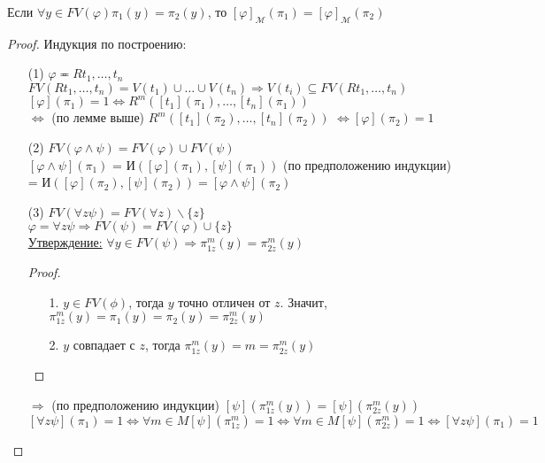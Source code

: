 \documentclass[a4paper, fleqn]{article}
\begin{document}
    \begin{lemma}
        Если $∀ y ∈ FV(\varphi) \pi_1(y) = \pi_2(y)$, то 
        $[\varphi]_{\mathcal{M}}(\pi_1) = [\varphi]_{\mathcal{M}}(\pi_2)$
    \end{lemma}
    \begin{proof}
        Индукция по построению: 
        \begin{itemize}
            \item[(1)] $\varphi \eqcirc Rt_1, \ldots, t_n$\\
            $FV(Rt_1, \ldots, t_n) = V(t_1) ∪ \ldots  ∪ V(t_n) ⇒
            V(t_i) ⊆ FV(Rt_1, \ldots, t_n)$  \\
            $[\varphi](\pi_1) = 1 ⇔ R^m([t_1](\pi_1), \ldots, [t_n](\pi_1))$
             \\
            $⇔$ (по лемме выше) $R^m([t_1](\pi_2), \ldots, [t_n](\pi_2))$
            $⇔ [\varphi](\pi_2) = 1$
            \item[(2)] 
            $FV(\varphi  ∧ \psi) = FV(\varphi) ∪ FV(\psi)$ \\
            $[\varphi  ∧ \psi](\pi_1)$ = И$([\varphi](\pi_1), [\psi](\pi_1)) 
            $ (по предположению индукции) = И$([\varphi](\pi_2), [\psi](\pi_2))
            = [\varphi  ∧ \psi](\pi_2)$
            \item[(3)]
            $FV(∀ z \psi) = FV(∀z) \backslash \{z\}$ \\  
            $\varphi=∀ z \psi ⇒ FV(\psi) = FV(\varphi) ∪ \{z\}$  \\

            \underline{Утверждение:} $∀ y ∈ FV(\psi) ⇒ \pi_{1 z}^m(y) = \pi_{2 z}^m(y)$
            \begin{proof} \ \\
                \begin{itemize} 
                    \item[1.] $y ∈ FV(\phi)$, тогда $y$ точно отличен от $z$. Значит,
                     $\pi_{1 z}^m(y) = \pi_1(y) = \pi_2(y) = \pi_{2 z}^m(y)$
                     \item[2.] $y$ совпадает с $z$, тогда
                     $\pi_{1 z}^m(y) = m = \pi_{2 z}^m(y)$  
                \end{itemize}   
            \end{proof}
            $⇒$ (по предположению индукции) 
            $[\psi](\pi_{1 z}^m(y)) = [\psi](\pi_{2 z}^m(y))$ \\[9.5pt]
            $[∀ z \psi](\pi_1) = 1 ⇔ ∀ m ∈ M [\psi](\pi_{1 z}^m) = 1
            ⇔ ∀ m ∈ M [\psi](\pi_{2 z}^m) = 1 ⇔ [∀ z \psi](\pi_1) = 1$
        \end{itemize}
    \end{proof}
\end{document}
